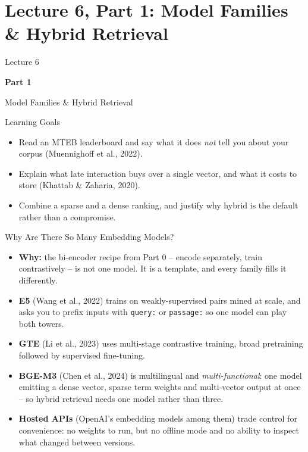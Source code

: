 \section{Lecture 6, Part 1: Model Families \& Hybrid Retrieval}

\begin{frame}
\vfill
\centering
{\color{RLBlue}\large Lecture 6}

\vspace{0.3em}
{\color{RLBlue}\Large\bfseries Part 1}

\vspace{0.6em}
{\Large Model Families \& Hybrid Retrieval}
\vfill
\end{frame}

\begin{frame}{Learning Goals}
\begin{itemize}
  \item Read an MTEB leaderboard and say what it does \emph{not} tell you about your corpus (Muennighoff et al., 2022).
  \pause
  \item Explain what late interaction buys over a single vector, and what it costs to store (Khattab \& Zaharia, 2020).
  \pause
  \item Combine a sparse and a dense ranking, and justify why hybrid is the default rather than a compromise.
\end{itemize}
\end{frame}

\begin{frame}{Why Are There So Many Embedding Models?}
\begin{itemize}
  \item \textbf{Why:} the bi-encoder recipe from Part 0 -- encode separately, train contrastively -- is not one model. It is a template, and every family fills it differently.
  \pause
  \item \textbf{E5} (Wang et al., 2022) trains on weakly-supervised pairs mined at scale, and asks you to prefix inputs with \texttt{query:} or \texttt{passage:} so one model can play both towers.
  \pause
  \item \textbf{GTE} (Li et al., 2023) uses multi-stage contrastive training, broad pretraining followed by supervised fine-tuning.
  \pause
  \item \textbf{BGE-M3} (Chen et al., 2024) is multilingual and \emph{multi-functional}: one model emitting a dense vector, sparse term weights and multi-vector output at once -- so hybrid retrieval needs one model rather than three.
  \pause
  \item \textbf{Hosted APIs} (OpenAI's embedding models among them) trade control for convenience: no weights to run, but no offline mode and no ability to inspect what changed between versions.
\end{itemize}
\end{frame}

